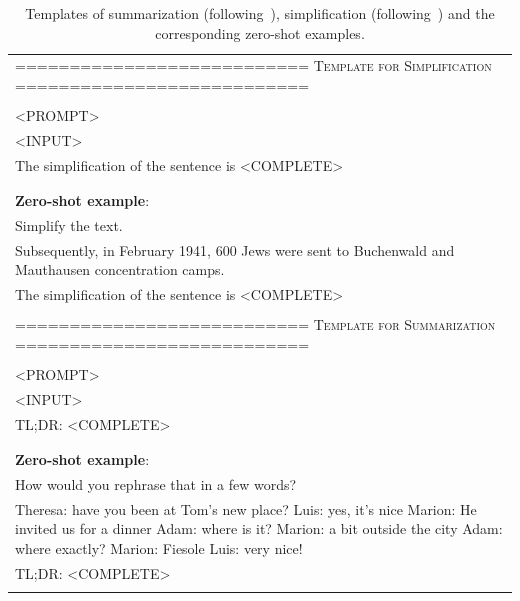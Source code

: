 \begin{table}[!htbp]
\small
    \centering
    \colorbox{gray!8}{
    \begin{tabular}{@{}p{14cm}}
    \toprule
    =========================== \textsc{Template for Simplification} =========================== \\\\
    <PROMPT>\\
    <INPUT>\\
    The simplification of the sentence is <COMPLETE>\\\\
    \midrule \\
    
    \textbf{Zero-shot example}: \\
    Simplify the text.\\
    Subsequently, in February 1941, 600 Jews were sent to Buchenwald and Mauthausen concentration camps.\\
    The simplification of the sentence is <COMPLETE>\\\\
    =========================== \textsc{Template for Summarization} =========================== \\\\
    <PROMPT>\\
    <INPUT>\\
    TL;DR: <COMPLETE>\\\\
    \midrule \\
    
    \textbf{Zero-shot example}: \\
    How would you rephrase that in a few words?\\
    Theresa: have you been at Tom's new place? Luis: yes, it's nice Marion: He invited us for a dinner Adam: where is it? Marion: a bit outside the city Adam: where exactly? Marion: Fiesole Luis: very nice!\\
    TL;DR: <COMPLETE>\\\\
        \bottomrule  
    \end{tabular}
    }
    \caption{Templates of summarization (following~\citet{sanh2021multitask,qin2023chatgpt}), simplification (following~\citet{li2023deliberate}) and the corresponding zero-shot examples.}
    \label{tab:gpt-temp}
\end{table}

